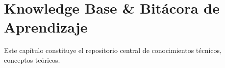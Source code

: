 \documentclass[../../main_compilation.tex]{subfiles}
\begin{document}
\chapter{Knowledge Base \& Bitácora de Aprendizaje}
\label{chap:knowledge_base}

Este capítulo constituye el repositorio central de conocimientos técnicos, conceptos teóricos.



\end{document}
